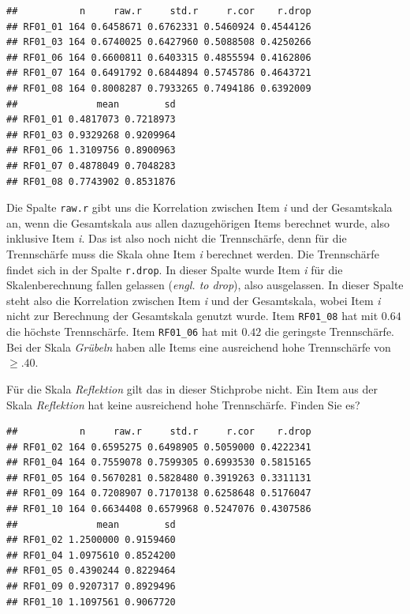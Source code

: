 \documentclass[
  ngerman,
]{book}
\newenvironment{Shaded}{\begin{snugshade}}{\end{snugshade}}
\newcommand{\CommentTok}[1]{\textcolor[rgb]{0.56,0.35,0.01}{\textit{#1}}}
\newcommand{\DecValTok}[1]{\textcolor[rgb]{0.00,0.00,0.81}{#1}}
\newcommand{\FunctionTok}[1]{\textcolor[rgb]{0.13,0.29,0.53}{\textbf{#1}}}
\newcommand{\NormalTok}[1]{#1}
\newcommand{\OtherTok}[1]{\textcolor[rgb]{0.56,0.35,0.01}{#1}}
\newcommand{\SpecialCharTok}[1]{\textcolor[rgb]{0.81,0.36,0.00}{\textbf{#1}}}
\begin{document}
\begin{verbatim}
##           n     raw.r     std.r     r.cor    r.drop
## RF01_01 164 0.6458671 0.6762331 0.5460924 0.4544126
## RF01_03 164 0.6740025 0.6427960 0.5088508 0.4250266
## RF01_06 164 0.6600811 0.6403315 0.4855594 0.4162806
## RF01_07 164 0.6491792 0.6844894 0.5745786 0.4643721
## RF01_08 164 0.8008287 0.7933265 0.7494186 0.6392009
##              mean        sd
## RF01_01 0.4817073 0.7218973
## RF01_03 0.9329268 0.9209964
## RF01_06 1.3109756 0.8900963
## RF01_07 0.4878049 0.7048283
## RF01_08 0.7743902 0.8531876
\end{verbatim}

Die Spalte \texttt{raw.r} gibt uns die Korrelation zwischen Item \emph{i} und der Gesamtskala an, wenn die Gesamtskala aus allen dazugehörigen Items berechnet wurde, also inklusive Item \emph{i}. Das ist also noch nicht die Trennschärfe, denn für die Trennschärfe muss die Skala ohne Item \emph{i} berechnet werden. Die Trennschärfe findet sich in der Spalte \texttt{r.drop}. In dieser Spalte wurde Item \emph{i} für die Skalenberechnung fallen gelassen (\emph{engl. to drop}), also ausgelassen. In dieser Spalte steht also die Korrelation zwischen Item \emph{i} und der Gesamtskala, wobei Item \emph{i} nicht zur Berechnung der Gesamtskala genutzt wurde. Item \texttt{RF01\_08} hat mit \(0.64\) die höchste Trennschärfe. Item \texttt{RF01\_06} hat mit \(0.42\) die geringste Trennschärfe. Bei der Skala \emph{Grübeln} haben alle Items eine ausreichend hohe Trennschärfe von \(\geq .40\).

Für die Skala \emph{Reflektion} gilt das in dieser Stichprobe nicht. Ein Item aus der Skala \emph{Reflektion} hat keine ausreichend hohe Trennschärfe. Finden Sie es?

\begin{Shaded}
\end{Shaded}

\begin{verbatim}
##           n     raw.r     std.r     r.cor    r.drop
## RF01_02 164 0.6595275 0.6498905 0.5059000 0.4222341
## RF01_04 164 0.7559078 0.7599305 0.6993530 0.5815165
## RF01_05 164 0.5670281 0.5828480 0.3919263 0.3311131
## RF01_09 164 0.7208907 0.7170138 0.6258648 0.5176047
## RF01_10 164 0.6634408 0.6579968 0.5247076 0.4307586
##              mean        sd
## RF01_02 1.2500000 0.9159460
## RF01_04 1.0975610 0.8524200
## RF01_05 0.4390244 0.8229464
## RF01_09 0.9207317 0.8929496
## RF01_10 1.1097561 0.9067720
\end{verbatim}
\end{document}

